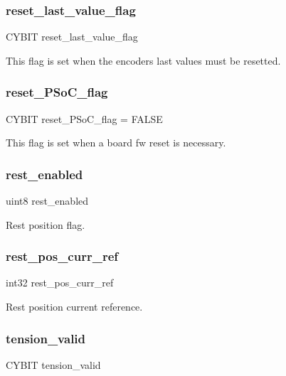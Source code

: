 \subsubsection{reset\+\_\+last\+\_\+value\+\_\+flag}
{\footnotesize\ttfamily C\+Y\+B\+IT reset\+\_\+last\+\_\+value\+\_\+flag}

This flag is set when the encoders last values must be resetted. \mbox{\label{globals_8c_a7f81d1d66186b1c7cd358ea7cfff2caf}} 
\subsubsection{reset\+\_\+\+P\+So\+C\+\_\+flag}
{\footnotesize\ttfamily C\+Y\+B\+IT reset\+\_\+\+P\+So\+C\+\_\+flag = F\+A\+L\+SE}

This flag is set when a board fw reset is necessary. \mbox{\label{globals_8c_a1f8839fadee52a47a0042eaa695c3f3a}} 
\subsubsection{rest\+\_\+enabled}
{\footnotesize\ttfamily uint8 rest\+\_\+enabled}

Rest position flag. \mbox{\label{globals_8c_a485e5b90bbfb79aa97f874873cd6c93a}} 
\subsubsection{rest\+\_\+pos\+\_\+curr\+\_\+ref}
{\footnotesize\ttfamily int32 rest\+\_\+pos\+\_\+curr\+\_\+ref}

Rest position current reference. \mbox{\label{globals_8c_ac42fa606610c2600210d9b7b2c1d0882}} 
\subsubsection{tension\+\_\+valid}
{\footnotesize\ttfamily C\+Y\+B\+IT tension\+\_\+valid}

